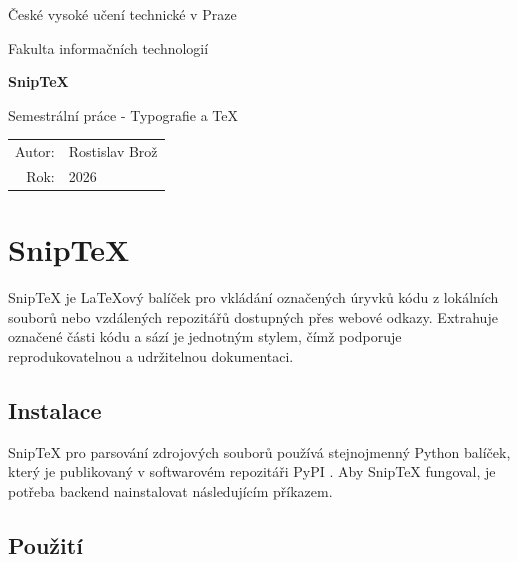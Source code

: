 \documentclass{article}
\begin{document}
\begin{titlepage}
    \centering

    {\Large České vysoké učení technické v Praze\par}
    {\Large Fakulta informačních technologií\par}

    \vspace{3cm}

    {\Huge\bfseries Snip\TeX\par}

    \vspace{0.5cm}

    {\Large Semestrální práce - Typografie a \TeX\par}

    \vfill

    \begin{tabular}{rl}
        Autor: & Rostislav Brož \\
        Rok: & 2026 \\
    \end{tabular}

    \vspace{2cm}
\end{titlepage}

\section*{Snip\TeX}

Snip\TeX{} je La\TeX{}ový balíček pro vkládání označených úryvků kódu z lokálních souborů 
nebo vzdálených repozitářů dostupných přes webové odkazy. 
Extrahuje označené části kódu a sází je jednotným stylem, 
čímž podporuje reprodukovatelnou a udržitelnou dokumentaci.

\subsection*{Instalace}

Snip\TeX{} pro parsování zdrojových souborů používá stejnojmenný Python balíček,
který je publikovaný v softwarovém repozitáři PyPI \citep{pypi}. 
Aby Snip\TeX{} fungoval, je potřeba backend nainstalovat následujícím příkazem.


\subsection*{Použití}
\end{document}
